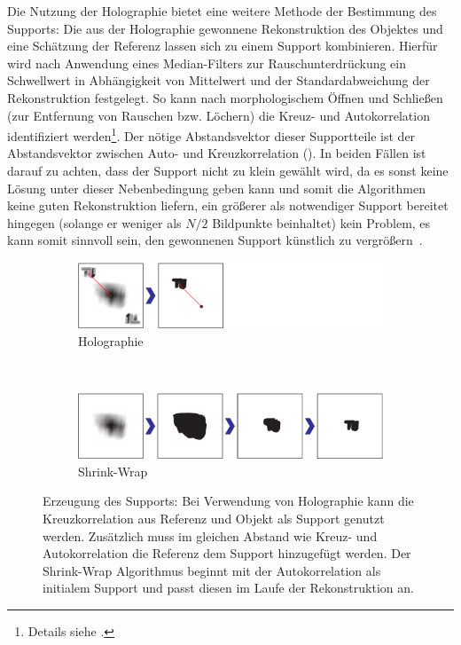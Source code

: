 Die Nutzung der Holographie bietet eine weitere Methode der Bestimmung des Supports: Die aus der Holographie gewonnene Rekonstruktion des Objektes und eine Schätzung der Referenz lassen sich zu einem Support kombinieren. Hierfür wird nach Anwendung eines Median-Filters zur Rauschunterdrückung ein Schwellwert in Abhängigkeit von Mittelwert und der Standardabweichung der Rekonstruktion festgelegt. So kann nach morphologischem Öffnen und Schließen (zur Entfernung von Rauschen bzw. Löchern) die Kreuz- und Autokorrelation identifiziert werden\footnote{Details siehe .}. Der nötige Abstandsvektor dieser Supportteile ist der Abstandsvektor zwischen Auto- und Kreuzkorrelation ().
In beiden Fällen ist darauf zu achten, dass der Support nicht zu klein gewählt wird, da es sonst keine Lösung unter dieser Nebenbedingung geben kann und somit die Algorithmen keine guten Rekonstruktion liefern, ein größerer als notwendiger Support bereitet hingegen (solange er weniger als $N/2$ Bildpunkte beinhaltet) kein Problem, es kann somit sinnvoll sein, den gewonnenen Support künstlich zu vergrößern~\cite{huang2010}.

\begin{figure}
	\centering
	\begin{subfigure}[b]{0.9\textwidth}
		\includegraphics[width=\textwidth]{images/support_holo.pdf}
		\caption{Holographie}
	\end{subfigure}\\

	\begin{subfigure}[b]{0.9\textwidth}
		\includegraphics[width=\textwidth]{images/support_sw.pdf}
		\caption{Shrink-Wrap}	
	\end{subfigure}
	
	\caption[Supportgenerierung]{Erzeugung des Supports: Bei Verwendung von Holographie kann die Kreuzkorrelation aus Referenz und Objekt als Support genutzt werden. Zusätzlich muss im gleichen Abstand wie Kreuz- und Autokorrelation die Referenz dem Support hinzugefügt werden. Der Shrink-Wrap Algorithmus beginnt mit der Autokorrelation als initialem Support und passt diesen im Laufe der Rekonstruktion an.}
	\label{fig:support}
\end{figure} 

